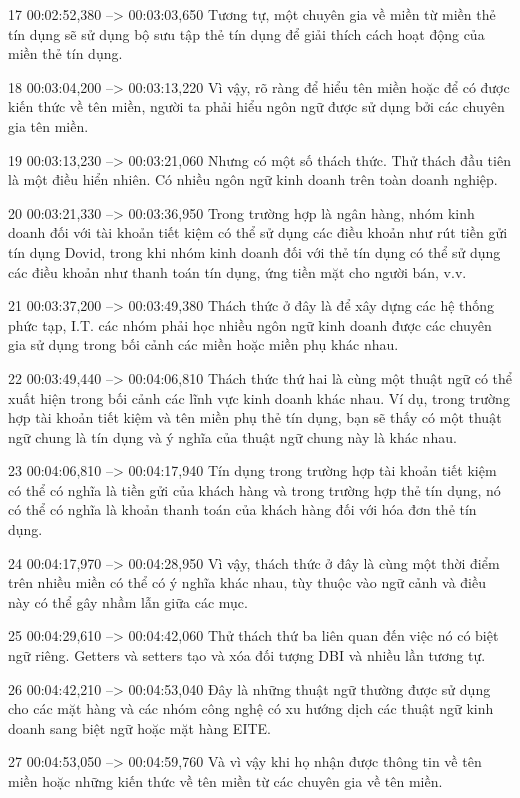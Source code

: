 17
00:02:52,380 --> 00:03:03,650
Tương tự, một chuyên gia về miền từ miền thẻ tín dụng sẽ sử dụng bộ sưu tập thẻ tín dụng để giải thích cách hoạt động của miền thẻ tín dụng.

18
00:03:04,200 --> 00:03:13,220
Vì vậy, rõ ràng để hiểu tên miền hoặc để có được kiến ​​thức về tên miền, người ta phải hiểu ngôn ngữ được sử dụng bởi các chuyên gia tên miền.

19
00:03:13,230 --> 00:03:21,060
Nhưng có một số thách thức.  Thử thách đầu tiên là một điều hiển nhiên.  Có nhiều ngôn ngữ kinh doanh trên toàn doanh nghiệp.

20
00:03:21,330 --> 00:03:36,950
Trong trường hợp là ngân hàng, nhóm kinh doanh đối với tài khoản tiết kiệm có thể sử dụng các điều khoản như rút tiền gửi tín dụng Dovid, trong khi nhóm kinh doanh đối với thẻ tín dụng có thể sử dụng các điều khoản như thanh toán tín dụng, ứng tiền mặt cho người bán, v.v.

21
00:03:37,200 --> 00:03:49,380
Thách thức ở đây là để xây dựng các hệ thống phức tạp, I.T.  các nhóm phải học nhiều ngôn ngữ kinh doanh được các chuyên gia sử dụng trong bối cảnh các miền hoặc miền phụ khác nhau.

22
00:03:49,440 --> 00:04:06,810
Thách thức thứ hai là cùng một thuật ngữ có thể xuất hiện trong bối cảnh các lĩnh vực kinh doanh khác nhau.  Ví dụ, trong trường hợp tài khoản tiết kiệm và tên miền phụ thẻ tín dụng, bạn sẽ thấy có một thuật ngữ chung là tín dụng và ý nghĩa của thuật ngữ chung này là khác nhau.

23
00:04:06,810 --> 00:04:17,940
Tín dụng trong trường hợp tài khoản tiết kiệm có thể có nghĩa là tiền gửi của khách hàng và trong trường hợp thẻ tín dụng, nó có thể có nghĩa là khoản thanh toán của khách hàng đối với hóa đơn thẻ tín dụng.

24
00:04:17,970 --> 00:04:28,950
Vì vậy, thách thức ở đây là cùng một thời điểm trên nhiều miền có thể có ý nghĩa khác nhau, tùy thuộc vào ngữ cảnh và điều này có thể gây nhầm lẫn giữa các mục.

25
00:04:29,610 --> 00:04:42,060
Thử thách thứ ba liên quan đến việc nó có biệt ngữ riêng.  Getters và setters tạo và xóa đối tượng DBI và nhiều lần tương tự.

26
00:04:42,210 --> 00:04:53,040
Đây là những thuật ngữ thường được sử dụng cho các mặt hàng và các nhóm công nghệ có xu hướng dịch các thuật ngữ kinh doanh sang biệt ngữ hoặc mặt hàng EITE.

27
00:04:53,050 --> 00:04:59,760
Và vì vậy khi họ nhận được thông tin về tên miền hoặc những kiến ​​thức về tên miền từ các chuyên gia về tên miền.

